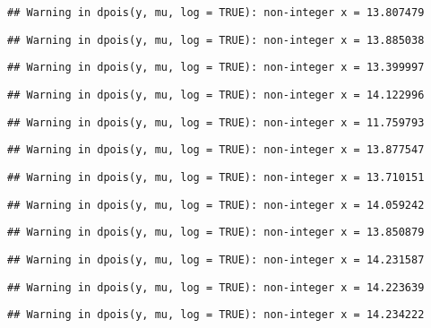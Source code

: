 \documentclass[
]{article}
\begin{document}
\begin{verbatim}
## Warning in dpois(y, mu, log = TRUE): non-integer x = 13.807479
\end{verbatim}

\begin{verbatim}
## Warning in dpois(y, mu, log = TRUE): non-integer x = 13.885038
\end{verbatim}

\begin{verbatim}
## Warning in dpois(y, mu, log = TRUE): non-integer x = 13.399997
\end{verbatim}

\begin{verbatim}
## Warning in dpois(y, mu, log = TRUE): non-integer x = 14.122996
\end{verbatim}

\begin{verbatim}
## Warning in dpois(y, mu, log = TRUE): non-integer x = 11.759793
\end{verbatim}

\begin{verbatim}
## Warning in dpois(y, mu, log = TRUE): non-integer x = 13.877547
\end{verbatim}

\begin{verbatim}
## Warning in dpois(y, mu, log = TRUE): non-integer x = 13.710151
\end{verbatim}

\begin{verbatim}
## Warning in dpois(y, mu, log = TRUE): non-integer x = 14.059242
\end{verbatim}

\begin{verbatim}
## Warning in dpois(y, mu, log = TRUE): non-integer x = 13.850879
\end{verbatim}

\begin{verbatim}
## Warning in dpois(y, mu, log = TRUE): non-integer x = 14.231587
\end{verbatim}

\begin{verbatim}
## Warning in dpois(y, mu, log = TRUE): non-integer x = 14.223639
\end{verbatim}

\begin{verbatim}
## Warning in dpois(y, mu, log = TRUE): non-integer x = 14.234222
\end{verbatim}
\end{document}
